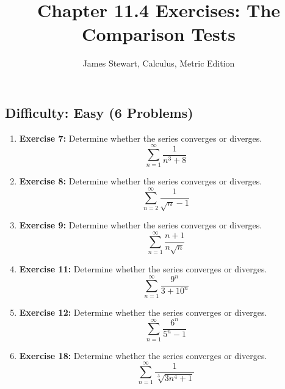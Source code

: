 \documentclass{article}
\title{Chapter 11.4 Exercises: The Comparison Tests}
\author{James Stewart, Calculus, Metric Edition}
\date{}
\begin{document}
\maketitle
\hrulefill %
\vspace{1em} %

\subsection*{Difficulty: Easy (6 Problems)}
\begin{enumerate}
    \item \textbf{Exercise 7:} Determine whether the series converges or diverges.
    \[ \sum_{n=1}^{\infty} \frac{1}{n^3 + 8} \]
    \item \textbf{Exercise 8:} Determine whether the series converges or diverges.
    \[ \sum_{n=2}^{\infty} \frac{1}{\sqrt{n}-1} \]
    \item \textbf{Exercise 9:} Determine whether the series converges or diverges.
    \[ \sum_{n=1}^{\infty} \frac{n+1}{n\sqrt{n}} \]
    \item \textbf{Exercise 11:} Determine whether the series converges or diverges.
    \[ \sum_{n=1}^{\infty} \frac{9^n}{3+10^n} \]
    \item \textbf{Exercise 12:} Determine whether the series converges or diverges.
    \[ \sum_{n=1}^{\infty} \frac{6^n}{5^n-1} \]
    \item \textbf{Exercise 18:} Determine whether the series converges or diverges.
    \[ \sum_{n=1}^{\infty} \frac{1}{\sqrt[3]{3n^4+1}} \]
\end{enumerate}

\hrulefill
\vspace{1em}

\end{document}
